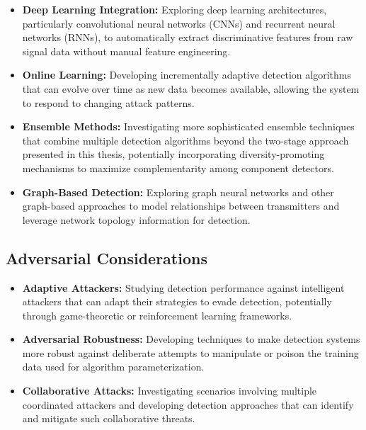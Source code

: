 \begin{itemize}
    \item \textbf{Deep Learning Integration:} Exploring deep learning architectures, particularly convolutional neural networks (CNNs) and recurrent neural networks (RNNs), to automatically extract discriminative features from raw signal data without manual feature engineering.

    \item \textbf{Online Learning:} Developing incrementally adaptive detection algorithms that can evolve over time as new data becomes available, allowing the system to respond to changing attack patterns.

    \item \textbf{Ensemble Methods:} Investigating more sophisticated ensemble techniques that combine multiple detection algorithms beyond the two-stage approach presented in this thesis, potentially incorporating diversity-promoting mechanisms to maximize complementarity among component detectors.
    
    \item \textbf{Graph-Based Detection:} Exploring graph neural networks and other graph-based approaches to model relationships between transmitters and leverage network topology information for detection.
\end{itemize}

\subsection{Adversarial Considerations}

\begin{itemize}
    \item \textbf{Adaptive Attackers:} Studying detection performance against intelligent attackers that can adapt their strategies to evade detection, potentially through game-theoretic or reinforcement learning frameworks.

    \item \textbf{Adversarial Robustness:} Developing techniques to make detection systems more robust against deliberate attempts to manipulate or poison the training data used for algorithm parameterization.
    
    \item \textbf{Collaborative Attacks:} Investigating scenarios involving multiple coordinated attackers and developing detection approaches that can identify and mitigate such collaborative threats.
\end{itemize}


